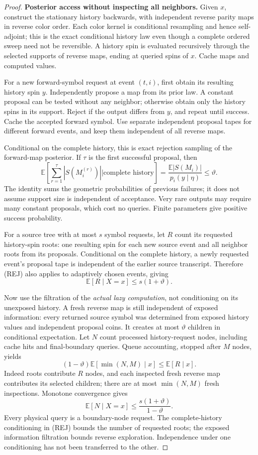 \documentclass[11pt]{article}
\theoremstyle{definition}
\theoremstyle{remark}
\begin{document}
\begin{proof}
\textbf{Posterior access without inspecting all neighbors.}
Given \(x\), construct the stationary history backwards, with
independent reverse parity maps in reverse color order. Each color
kernel is conditional resampling and hence self-adjoint; this is the
exact conditional history law even though a complete ordered sweep
need not be reversible. A history spin is evaluated recursively through
the selected supports of reverse maps, ending at queried spins of
\(x\). Cache maps and computed values.

For a new forward-symbol request at event \((t,i)\), first obtain
its resulting history spin \(y\). Independently propose a map from
its prior law. A constant proposal can be tested without any neighbor;
otherwise obtain only the history spins in its support. Reject if the
output differs from \(y\), and repeat until success. Cache the
accepted forward symbol. Use separate independent proposal tapes for
different forward events, and keep them independent of all reverse
maps.

Conditional on the complete history, this is exact rejection sampling
of the forward-map posterior. If \(\tau\) is the first successful
proposal, then
\[
 \mathbb E\left[\sum_{r=1}^{\tau}|S(M_i^{(r)})|
       \mathrel{\Big|}\text{complete history}\right]
 =\frac{\mathbb E|S(M_i)|}{p_i(y\mid\eta)}
 \le\vartheta.                                   \tag{REJ}
\]
The identity sums the geometric probabilities of previous failures;
it does not assume support size is independent of acceptance. Very
rare outputs may require many constant proposals, which cost no
queries. Finite parameters give positive success probability.

For a source tree with at most \(s\) symbol requests, let \(R\)
count its requested history-spin roots: one resulting spin for each
new source event and all neighbor roots from its proposals. Conditional
on the complete history, a newly requested event's proposal tape is
independent of the earlier source transcript. Therefore (REJ) also
applies to adaptively chosen events, giving
\[
 \mathbb E[R\mid X=x]\le s(1+\vartheta).          \tag{ROOT}
\]

Now use the filtration of the \emph{actual lazy computation}, not
conditioning on its unexposed history. A fresh reverse map is still
independent of exposed information: every returned source symbol was
determined from exposed history values and independent proposal coins.
It creates at most \(\vartheta\) children in conditional expectation.
Let \(N\) count processed history-request nodes, including cache hits
and final-boundary queries. Queue accounting, stopped after \(M\)
nodes, yields
\[
 (1-\vartheta)\mathbb E[\min(N,M)\mid x]
 \le\mathbb E[R\mid x].
\]
Indeed roots contribute \(R\) nodes, and each inspected fresh reverse
map contributes its selected children; there are at most
\(\min(N,M)\) fresh inspections. Monotone convergence gives
\[
 \mathbb E[N\mid X=x]
 \le\frac{s(1+\vartheta)}{1-\vartheta}.           \tag{POST}
\]
Every physical query is a boundary-node request. The complete-history
conditioning in (REJ) bounds the number of requested roots; the exposed
information filtration bounds reverse exploration. Independence under
one conditioning has not been transferred to the other.


\end{proof}
\end{document}
